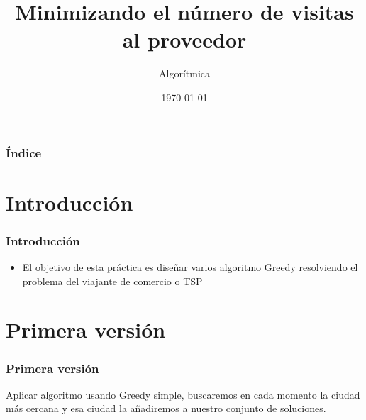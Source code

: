 \documentclass{beamer}
\title[Practica 3]{Minimizando el número de visitas al proveedor} %
\author{Algorítmica} %
\institute[UGR] %
{
Universidad de Granada \\ %
\medskip

}
\date{\today} %
\begin{document}
\begin{frame}
\titlepage %
\end{frame}

\begin{frame}
\frametitle{Índice} %
\tableofcontents %
\end{frame}


\section{Introducción }
\begin{frame}
	\frametitle{Introducción}
	\begin{itemize}
		\item El objetivo de esta práctica es diseñar varios algoritmo Greedy resolviendo el problema del viajante de comercio o TSP
	\end{itemize}
\end{frame}


\section{Primera versión} 
\begin{frame}
	\frametitle{Primera versión}
	Aplicar algoritmo usando Greedy simple, buscaremos en cada momento la ciudad más cercana y esa ciudad
	la añadiremos a nuestro conjunto de soluciones. 
	
\end{frame}

\end{document}
